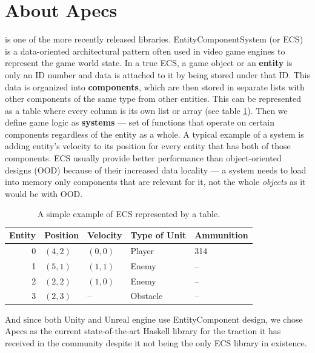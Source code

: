 \documentclass[
  digital, %
  color,   %
  table,   %
  oneside, %
  lof,     %
  lot,     %
]{fithesis3}
\begin{document}
\section{About Apecs}
\label{sect:apecs}
\cite{apecsrepo}
is one of the more recently released libraries.
Entity\textendash{}Component\textendash{}System (or ECS) is a data-oriented architectural pattern often
used in video game engines to represent the game world state.
In a true ECS, a game object or an \textbf{entity} is only an ID number
and data is attached to it by being stored under that ID. This data is
organized into \textbf{components}, which are then stored in separate
lists with other components of the same type from other entities.\cite{mediumecs} This can
be represented as a table where every column is its own list or array
(see table \ref{tab:ecsexamp}). Then we define game logic as \textbf{systems}
--- set of functions that operate on certain components regardless of the
entity as a whole. A typical example of a system is adding entity's velocity
to its position for every entity that has both of those components.
ECS usually provide better performance than object-oriented designs (OOD)
because of their increased data locality --- a system needs to load into memory
only components that are relevant for it, not the whole \emph{objects}
as it would be with OOD.\cite{apecspaper}
\begin{table}[htp]
  \begin{tabularx}{320pt}{|r|lllX|}
    \toprule
    Entity & Position & Velocity & Type of Unit & Ammunition \\
    \midrule
    0 & $(4,2)$ & $(0,0)$ & Player   & 314\\
    1 & $(5,1)$ & $(1,1)$ & Enemy    & -- \\
    2 & $(2,2)$ & $(1,0)$ & Enemy    & -- \\
    3 & $(2,3)$ & --      & Obstacle & -- \\
    \bottomrule
  \end{tabularx}
  \caption{A simple example of ECS represented by a table.}
  \label{tab:ecsexamp}
\end{table}

And since both Unity and Unreal engine use Entity\textendash{}Component design,
we chose Apecs as the current state-of-the-art Haskell library
for the traction it has received in the community despite
it not being the only ECS library in existence.\footnotemark
{}
\end{document}
